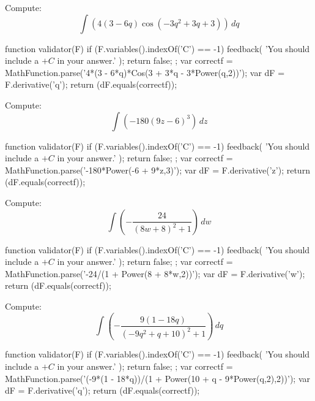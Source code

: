 \documentclass{ximera}
\renewcommand{\d}{\, d}
\begin{document}
\begin{exercise}
Compute: 
\[
\int \left(4 (3-6 q) \cos \left(-3 q^2+3 q+3\right)\right)\d q
\]
\begin{expressionAnswer}
     function validator(F) {
      if (F.variables().indexOf('C') == -1) {
        feedback( 'You should include a $+C$ in your answer.' );
        return false;
      };      
      var correctf = MathFunction.parse('4*(3 - 6*q)*Cos(3 + 3*q - 3*Power(q,2))');
      var dF = F.derivative('q');
      return (dF.equals(correctf));
    }
\end{expressionAnswer}
\end{exercise}



\begin{exercise}
Compute: 
\[
\int \left(-180 (9 z-6)^3\right)\d z
\]
\begin{expressionAnswer}
     function validator(F) {
      if (F.variables().indexOf('C') == -1) {
        feedback( 'You should include a $+C$ in your answer.' );
        return false;
      };      
      var correctf = MathFunction.parse('-180*Power(-6 + 9*z,3)');
      var dF = F.derivative('z');
      return (dF.equals(correctf));
    }
\end{expressionAnswer}
\end{exercise}



\begin{exercise}
Compute: 
\[
\int \left(-\frac{24}{(8 w+8)^2+1}\right)\d w
\]
\begin{expressionAnswer}
     function validator(F) {
      if (F.variables().indexOf('C') == -1) {
        feedback( 'You should include a $+C$ in your answer.' );
        return false;
      };      
      var correctf = MathFunction.parse('-24/(1 + Power(8 + 8*w,2))');
      var dF = F.derivative('w');
      return (dF.equals(correctf));
    }
\end{expressionAnswer}
\end{exercise}



\begin{exercise}
Compute: 
\[
\int \left(-\frac{9 (1-18 q)}{\left(-9 q^2+q+10\right)^2+1}\right)\d q
\]
\begin{expressionAnswer}
     function validator(F) {
      if (F.variables().indexOf('C') == -1) {
        feedback( 'You should include a $+C$ in your answer.' );
        return false;
      };      
      var correctf = MathFunction.parse('(-9*(1 - 18*q))/(1 + Power(10 + q - 9*Power(q,2),2))');
      var dF = F.derivative('q');
      return (dF.equals(correctf));
    }
\end{expressionAnswer}
\end{exercise}
\end{document}
